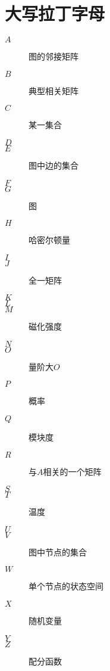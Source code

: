 \documentclass{ctexart}
\begin{document}
\section{大写拉丁字母}
\begin{description}
    \item[$A$] 图的邻接矩阵
    \item[$B$] 典型相关矩阵
    \item[$C$] 某一集合
    \item[$D$] 
    \item[$E$] 图中边的集合
    \item[$F$] 
    \item[$G$] 图
    \item[$H$] 哈密尔顿量
    \item[$I$] 
    \item[$J$] 全一矩阵
    \item[$K$] 
    \item[$L$] 
    \item[$M$] 磁化强度
    \item[$N$] 
    \item[$O$] 量阶大$O$
    \item[$P$] 概率
    \item[$Q$] 模块度
    \item[$R$] 与$A$相关的一个矩阵
    \item[$S$] 
    \item[$T$] 温度
    \item[$U$] 
    \item[$V$] 图中节点的集合
    \item[$W$] 单个节点的状态空间
    \item[$X$] 随机变量
    \item[$Y$] 
    \item[$Z$] 配分函数
\end{description}
\end{document}
